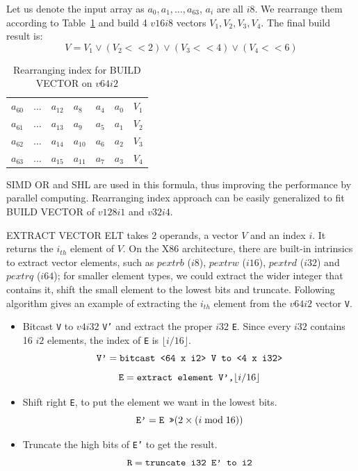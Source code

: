 Let us denote the input array as $a_0, a_1, \ldots, a_{63}$, $a_i$ are all $i8$. We rearrange them according to Table~\ref{table:build_vector} and build 4 $v16i8$ vectors $V_1, V_2, V_3, V_4$. The final build result is:
\begin{equation}
  V = V_1 \lor (V_2 << 2) \lor (V_3 << 4) \lor (V_4 << 6)
\end{equation}

\begin{table}[h]
\centering
\begin{tabular}{|p{1cm}|p{1cm}|p{1cm}|p{1cm}|p{1cm}|p{1cm}|r}
\cline{1-6}
$a_{60}$ & $\ldots$ & $a_{12}$ & $a_8$ & $a_4$ & $a_0$ & $V_1$ \\ \cline{1-6}
$a_{61}$ & $\ldots$ & $a_{13}$ & $a_9$ & $a_5$ & $a_1$ & $V_2$ \\ \cline{1-6}
$a_{62}$ & $\ldots$ & $a_{14}$ & $a_{10}$ & $a_6$ & $a_2$ & $V_3$ \\ \cline{1-6}
$a_{63}$ & $\ldots$ & $a_{15}$ & $a_{11}$ & $a_7$ & $a_3$ & $V_4$ \\ \cline{1-6}
\end{tabular}
\caption{Rearranging index for BUILD VECTOR on $v64i2$}
\label{table:build_vector}
\end{table}

SIMD OR and SHL are used in this formula, thus improving the performance by parallel computing. Rearranging index approach can be easily generalized to fit BUILD VECTOR of $v128i1$ and $v32i4$.

EXTRACT VECTOR ELT takes 2 operands, a vector $V$ and an index $i$. It returns the $i_{th}$ element of $V$. On the X86 architecture, there are built-in intrinsics to extract vector elements, such as $pextrb$ ($i8$), $pextrw$ ($i16$), $pextrd$ ($i32$) and $pextrq$ ($i64$); for smaller element types, we could extract the wider integer that contains it, shift the small element to the lowest bits and truncate. Following algorithm gives an example of extracting the $i_{th}$ element from the $v64i2$ vector {\tt V}.

\begin{itemize}
  \item Bitcast {\tt V} to $v4i32$ {\tt V'} and extract the proper $i32$ {\tt E}. Since every $i32$ contains 16 $i2$ elements, the index of {\tt E} is $\lfloor i / 16 \rfloor$.
  \[\text{\tt V'} = \text{\tt bitcast <64 x i2> V to <4 x i32>} \]
  \[\text{\tt E} = \text{\tt extract element V',} \lfloor i / 16 \rfloor \]
  \item Shift right {\tt E}, to put the element we want in the lowest bits.
  \[\text{\tt E'} = \text{\tt E >>} (2 \times (i \bmod 16))\]
  \item Truncate the high bits of {\tt E'} to get the result.
  \[\text{\tt R} = \text{\tt truncate i32 E' to i2}\]
\end{itemize}

